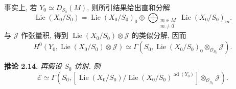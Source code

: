 事实上, 若 \(Y_0\simeq D_{S_0}(M)\), 则所引结果给出直和分解
\[
 \operatorname{Lie}(X_0/S_0)
 =\operatorname{Lie}(X_0/S_0)_0
 \oplus
 \bigoplus_{\substack{m\in M\\m\ne0}}
 \operatorname{Lie}(X_0/S_0)_m.
\]
与 \(\mathscr J\) 作张量积, 得到
\(\operatorname{Lie}(X_0/S_0)\otimes\mathscr J\) 的类似分解, 因而
\[
 H^0\!\left(Y_0,
  \operatorname{Lie}(X_0/S_0)\otimes\mathscr J\right)
 \simeq
 \Gamma\!\left(S_0,
  \operatorname{Lie}(X_0/S_0)_0
  \otimes_{\mathscr O_{S_0}}\mathscr J\right).
\]

\medskip
\noindent{}\textbf{推论 2.14.}
\textit{再假设 \(S_0\) 仿射. 则}
\[
 \mathcal E\simeq
 \Gamma\!\left(
  S_0,
  \left[
   \operatorname{Lie}(X_0/S_0)
   \big/
   \operatorname{Lie}(X_0/S_0)^{\operatorname{ad}(Y_0)}
  \right]
  \otimes_{\mathscr O_{S_0}}\mathscr J
 \right).
\]


